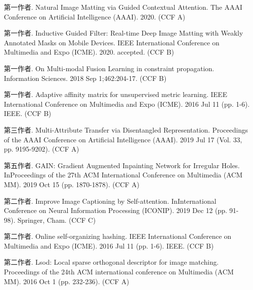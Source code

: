 \begin{publications*}
  \item 第一作者. Natural Image Matting via Guided Contextual Attention. The AAAI Conference on Artificial Intelligence (AAAI). 2020. (CCF A)
  \item 第一作者. Inductive Guided Filter: Real-time Deep Image Matting with Weakly Annotated Masks on Mobile Devices. IEEE International Conference on Multimedia and Expo (ICME). 2020. accepted. (CCF B)
  \item 第一作者. On Multi-modal Fusion Learning in constraint propagation. Information Sciences. 2018 Sep 1;462:204-17. (CCF B)
  \item 第一作者. Adaptive affinity matrix for unsupervised metric learning. IEEE International Conference on Multimedia and Expo (ICME). 2016 Jul 11 (pp. 1-6). IEEE. (CCF B)
  \item 第三作者. Multi-Attribute Transfer via Disentangled Representation. Proceedings of the AAAI Conference on Artificial Intelligence (AAAI). 2019 Jul 17 (Vol. 33, pp. 9195-9202). (CCF A)
  \item 第五作者. GAIN: Gradient Augmented Inpainting Network for Irregular Holes. InProceedings of the 27th ACM International Conference on Multimedia (ACM MM). 2019 Oct 15 (pp. 1870-1878). (CCF A)
  \item 第二作者. Improve Image Captioning by Self-attention. InInternational Conference on Neural Information Processing (ICONIP). 2019 Dec 12 (pp. 91-98). Springer, Cham. (CCF C)
  \item 第二作者. Online self-organizing hashing. IEEE International Conference on Multimedia and Expo (ICME). 2016 Jul 11 (pp. 1-6). IEEE. (CCF B)
  \item 第二作者. Lsod: Local sparse orthogonal descriptor for image matching. Proceedings of the 24th ACM international conference on Multimedia (ACM MM). 2016 Oct 1 (pp. 232-236). (CCF A)

\end{publications*}

